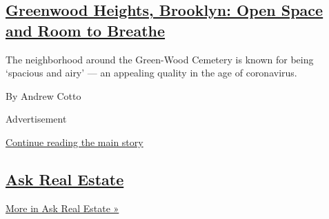 \begin{enumerate}
  \hypertarget{greenwood-heights-brooklyn-open-space-and-room-to-breathe}{%
  \subsection{\texorpdfstring{\href{/2020/08/05/realestate/greenwood-heights-brooklyn.html}{Greenwood
  Heights, Brooklyn: Open Space and Room to
  Breathe}}{Greenwood Heights, Brooklyn: Open Space and Room to Breathe}}\label{greenwood-heights-brooklyn-open-space-and-room-to-breathe}}

  The neighborhood around the Green-Wood Cemetery is known for being
  `spacious and airy' --- an appealing quality in the age of
  coronavirus.

  By Andrew Cotto
\end{enumerate}

Advertisement

\protect\hyperlink{after-mid1}{Continue reading the main story}

\hypertarget{ask-real-estate}{%
\subsection{\texorpdfstring{\href{/column/ask-real-estate}{Ask Real
Estate}}{Ask Real Estate}}\label{ask-real-estate}}

\href{/column/ask-real-estate}{More in Ask Real Estate »}

